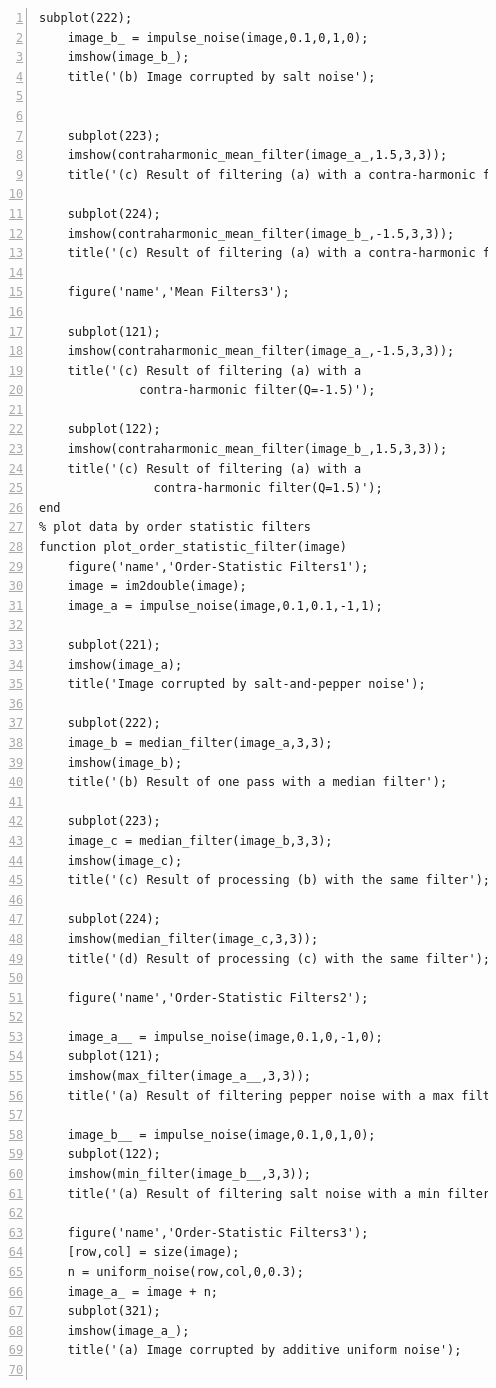 \documentclass[11pt,oneside]{book}
\begin{document}
\begin{appendices}
\begin{lstlisting}[numbers=left, numberstyle=\tiny,keywordstyle=\color{blue!70},commentstyle=\color{red!50!green!50!blue!50},frame=shadowbox, rulesepcolor=\color{red!20!green!20!blue!20}]
    subplot(222);
    image_b_ = impulse_noise(image,0.1,0,1,0);
    imshow(image_b_);
    title('(b) Image corrupted by salt noise');
    
    
    subplot(223);
    imshow(contraharmonic_mean_filter(image_a_,1.5,3,3));
    title('(c) Result of filtering (a) with a contra-harmonic filter');
    
    subplot(224);
    imshow(contraharmonic_mean_filter(image_b_,-1.5,3,3));
    title('(c) Result of filtering (a) with a contra-harmonic filter');
    
    figure('name','Mean Filters3');
    
    subplot(121);
    imshow(contraharmonic_mean_filter(image_a_,-1.5,3,3));
    title('(c) Result of filtering (a) with a 
              contra-harmonic filter(Q=-1.5)');
    
    subplot(122);
    imshow(contraharmonic_mean_filter(image_b_,1.5,3,3));
    title('(c) Result of filtering (a) with a 
                contra-harmonic filter(Q=1.5)');
end
% plot data by order statistic filters
function plot_order_statistic_filter(image)
    figure('name','Order-Statistic Filters1');
    image = im2double(image);
    image_a = impulse_noise(image,0.1,0.1,-1,1);
    
    subplot(221);
    imshow(image_a);
    title('Image corrupted by salt-and-pepper noise');
    
    subplot(222);
    image_b = median_filter(image_a,3,3);
    imshow(image_b);
    title('(b) Result of one pass with a median filter');
    
    subplot(223);
    image_c = median_filter(image_b,3,3);
    imshow(image_c);
    title('(c) Result of processing (b) with the same filter');
    
    subplot(224);
    imshow(median_filter(image_c,3,3));
    title('(d) Result of processing (c) with the same filter');
    
    figure('name','Order-Statistic Filters2');
    
    image_a__ = impulse_noise(image,0.1,0,-1,0);
    subplot(121);
    imshow(max_filter(image_a__,3,3));
    title('(a) Result of filtering pepper noise with a max filter');
    
    image_b__ = impulse_noise(image,0.1,0,1,0);
    subplot(122);
    imshow(min_filter(image_b__,3,3));
    title('(a) Result of filtering salt noise with a min filter');
    
    figure('name','Order-Statistic Filters3');
    [row,col] = size(image);
    n = uniform_noise(row,col,0,0.3);
    image_a_ = image + n;
    subplot(321);
    imshow(image_a_);
    title('(a) Image corrupted by additive uniform noise');
    

\end{lstlisting}
\end{appendices}
\end{document}
